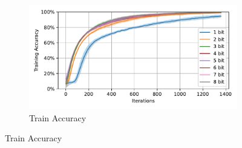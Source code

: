     \label{appendix:accuracy_curves_dvs_gesture}
        \begin{figure}[H]
            \centering
            \begin{subfigure}[H]{\textwidth}
                \centering
                \includegraphics[width=\textwidth]{../standard/DVSGesture/plots/dvsgesture_train_acc.pdf}
                \caption{Train Accuracy}
            \end{subfigure}
        \end{figure}
